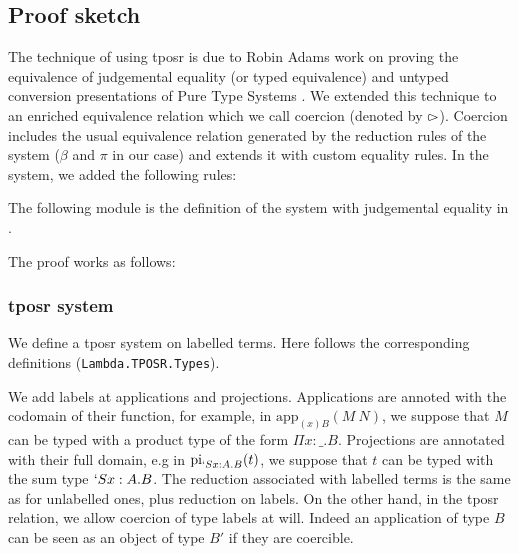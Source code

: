 \documentclass[11pt]{article}
\def\TPOSR{{\sc tposr}\xspace}
\def\coqmodule#1{\texttt{#1}}
\begin{document}
\subsection*{Proof sketch}
The technique of using \TPOSR is due to Robin Adams work on proving the
equivalence of judgemental equality (or typed equivalence) and untyped
conversion presentations of Pure Type Systems \cite{adams:PTSEQ}. We
extended this technique to an enriched equivalence relation which we
call coercion (denoted by $\rightslice$). Coercion includes the usual equivalence relation
generated by the reduction rules of the system ($\beta$ and $\pi$ in our
case) and extends it with custom equality rules. In the \Russell system,
we added the following rules:

\begin{center}
\SubProof\DP
\vspace{1em}

\SubSub\DP
\end{center}

The following module is the definition of the \Russell system with
judgemental equality in \Coq.




\def\lapp#1#2{\text{app}_{#1}(#2)}
\def\lpi#1#2{\text{pi}_{#1}(#2)}
\def\rel{\mathcal{R}}



The proof works as follows: 

\subsubsection*{\TPOSR system}
We define a \TPOSR system on labelled terms. Here follows the
corresponding \Coq definitions (\coqmodule{Lambda.TPOSR.Types}).

\vspace{1em}



We add labels at applications and projections. 
Applications are annoted with the codomain of their function, for example, in
$\lapp{(x)B}{M~N}$, we suppose that $M$ can be typed with a product
type of the form $\Pi x : \_. B$. Projections are annotated with their
full domain, e.g in $\lpi{`S x : A.B}{t}$, we suppose that $t$ can be
typed with the sum type $`S x : A.B$. The reduction associated with
labelled terms is the same as for unlabelled ones, plus reduction on
labels. On the other hand, in the \TPOSR relation, we allow coercion
of type labels at will. Indeed an application of type $B$ can be seen
as an object of type $B'$ if they are coercible. 
\end{document}

